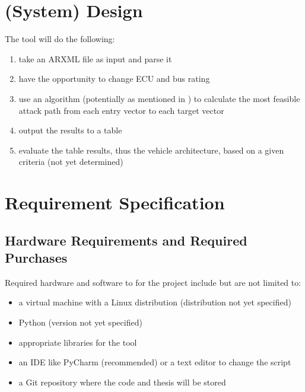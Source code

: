 \chapter{(System) Design}
\label{chp:design}

The tool will do the following:

\begin{enumerate}
	\item take an ARXML file as input and parse it
	\item have the opportunity to change ECU and bus rating
	\item use an algorithm (potentially as mentioned in \cite{threat_surf}) to calculate the most feasible attack path from each entry vector to each target vector
	\item output the results to a table
	\item evaluate the table results, thus the vehicle architecture, based on a given criteria (not yet determined)
\end{enumerate}


	\chapter{Requirement Specification}
\label{chp:specification}

\section{Hardware Requirements and Required Purchases}
\label{chp:hardware-purchases}

Required hardware and software to for the project include but are not limited to:
\begin{itemize}
	\item a virtual machine with a Linux distribution (distribution not yet specified)
	\item Python (version not yet specified)
	\item appropriate libraries for the tool
	\item an IDE like PyCharm (recommended) or a text editor to change the script
	\item a Git repository where the code and thesis will be stored
\end{itemize}



